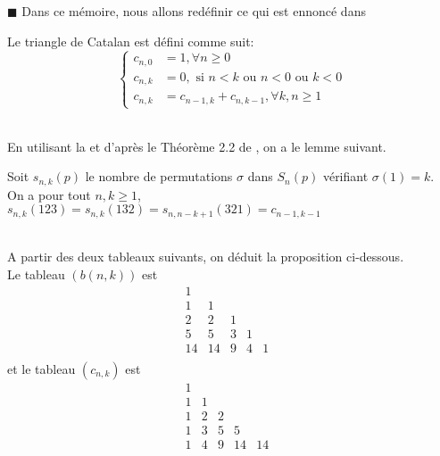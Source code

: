 $\blacksquare$ \newpage
Dans ce mémoire, nous allons redéfinir ce qui est ennoncé dans \cite{Desantis}
\begin{rm}
	\begin{definition}\label{firstDefLab}
		Le triangle de Catalan est défini comme suit:
		$$
			\begin{cases}
				c_{n, 0} & = 1, \forall n\geq 0                                 \\
				c_{n, k} & = 0, \text{ si } n<k \text{ ou } n<0 \text{ ou } k<0 \\
				c_{n, k} & = c_{n-1, k} + c_{n, k-1}, \forall k, n \geq 1
			\end{cases}
		$$
	\end{definition}
\end{rm}
\text{}\vspace{10pt}\\
En utilisant la  et d'après le Théorème 2.2 de \cite{Desantis}, on a le lemme suivant.
\begin{lemme}
	Soit $s_{n, k} (p)$ le nombre de permutations $\sigma$ dans $S_{n}(p)$ vérifiant $\sigma(1)=k$.\\ On a pour tout $n, k \geq 1$, $s_{n,k}(123) = s_{n,k}(132) = s_{n, n-k+1}(321) = c_{n-1, k-1}$
\end{lemme}
\text{ }\\
A partir des deux tableaux suivants, on déduit la proposition ci-dessous.\vspace{5pt}\\
Le tableau $(b(n, k))$ est
$$
	\begin{matrix}
		1  &                  \\
		1  & 1  &             \\
		2  & 2  & 1 &         \\
		5  & 5  & 3 & 1 &     \\
		14 & 14 & 9 & 4 & 1 & \\
	\end{matrix}
$$
et le tableau $(c_{n, k})$ est
$$
	\begin{matrix}
		1 &                   \\
		1 & 1 &               \\
		1 & 2 & 2 &           \\
		1 & 3 & 5 & 5  &      \\
		1 & 4 & 9 & 14 & 14 & \\
	\end{matrix}
$$
